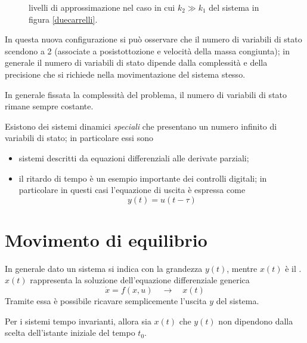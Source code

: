  	\begin{figure}[bht]
 		\centering
 		\begin{subfigure}{0.48\linewidth}
 			\centering
 			 \caption{}
 		\end{subfigure}
	 	\begin{subfigure}{0.48\linewidth}
		 	\centering
		 	 \caption{}
		 \end{subfigure}
	 	\caption{livelli di approssimazione nel caso in cui $k_2\gg k_1$ del sistema in figura \ref{duecarrelli}.}
	 	\label{fig:class:carrelliapprossimati}
 	\end{figure}
 	
 	In questa nuova configurazione si può osservare che il numero di variabili di stato scendono a 2  (associate a posistottozione e velocità della massa congiunta); in generale il numero di variabili di stato dipende dalla complessità e della precisione che si richiede nella movimentazione del sistema stesso.
 	
 	In generale fissata la complessità del problema, il numero di variabili di stato rimane sempre costante.
 	
 	\vspace{3mm} 
 	Esistono dei sistemi dinamici \textit{speciali} che presentano un numero infinito di variabili di stato; in particolare essi sono
 	\begin{itemize}
 		\item sistemi descritti da equazioni differenziali alle derivate parziali;
 		\item il ritardo di tempo è un esempio importante dei controlli digitali; in particolare in questi casi l'equazione di uscita è espressa come
 		\[y(t) = u(t-\tau)\]
 	\end{itemize}
 	
 	
 	
 	
\section{Movimento di equilibrio}
 	
 	
 	In generale dato un sistema si indica con  la grandezza $y(t)$, mentre $x(t)$ è il . $x(t)$ rappresenta la soluzione dell'equazione differenziale generica
 	\[ \dot x = f(x,u) \quad \rightarrow \quad x(t) \]
 	Tramite essa è possibile ricavare semplicemente l'uscita $y$ del sistema.
 	
 	\begin{nota}
 		Per i sistemi tempo invarianti, allora sia $x(t)$ che $y(t)$ non dipendono dalla scelta dell'istante iniziale del tempo $t_0$.
 	\end{nota}
 	
